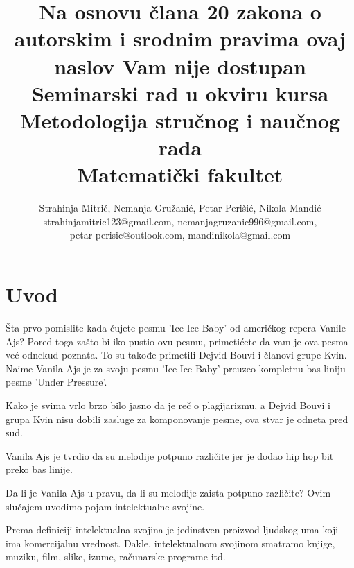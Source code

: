 \documentclass[a4paper]{article}
\begin{document}
\title{Na osnovu člana 20 zakona o autorskim i srodnim pravima ovaj naslov Vam nije dostupan\\
\large Seminarski rad u okviru kursa\\Metodologija stručnog i naučnog rada\\ Matematički fakultet}

\author{Strahinja Mitrić, Nemanja Gružanić, Petar Perišić, Nikola Mandić\\ strahinjamitric123@gmail.com, nemanjagruzanic996@gmail.com,\\ petar-perisic@outlook.com, mandinikola@gmail.com
}

\maketitle



\tableofcontents

\newpage

\section{Uvod}
\label{sec:uvod}

Šta prvo pomislite kada čujete pesmu 'Ice Ice Baby' od američkog repera Vanile Ajs?
Pored toga zašto bi iko pustio ovu pesmu, primetićete da vam je ova pesma već odnekud poznata.
To su takođe primetili Dejvid Bouvi i članovi grupe Kvin.
Naime Vanila Ajs je za svoju pesmu 'Ice Ice Baby' preuzeo kompletnu bas liniju pesme 'Under Pressure'.

Kako je svima vrlo brzo bilo jasno da je reč o plagijarizmu, a Dejvid Bouvi i grupa Kvin nisu dobili
zasluge za komponovanje pesme, ova stvar je odneta pred sud.

Vanila Ajs je tvrdio da su melodije potpuno različite jer je dodao hip hop bit preko bas linije. \cite{rollingstone}

Da li je Vanila Ajs u pravu, da li su melodije zaista potpuno različite? Ovim slučajem uvodimo pojam intelektualne svojine.

Prema definiciji intelektualna svojina je jedinstven proizvod ljudskog uma koji ima komercijalnu vrednost. \cite{texasUniv}
Dakle, intelektualnom svojinom smatramo knjige, muziku, film, slike, izume, računarske programe itd.
\end{document}
